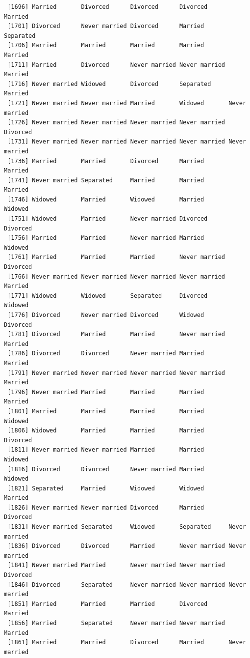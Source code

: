 \documentclass[
  letterpaper,
  DIV=11,
  numbers=noendperiod,
  oneside]{scrartcl}
\begin{document}
\begin{verbatim}
 [1696] Married       Divorced      Divorced      Divorced      Married      
 [1701] Divorced      Never married Divorced      Married       Separated    
 [1706] Married       Married       Married       Married       Married      
 [1711] Married       Divorced      Never married Never married Married      
 [1716] Never married Widowed       Divorced      Separated     Married      
 [1721] Never married Never married Married       Widowed       Never married
 [1726] Never married Never married Never married Never married Divorced     
 [1731] Never married Never married Never married Never married Never married
 [1736] Married       Married       Divorced      Married       Married      
 [1741] Never married Separated     Married       Married       Married      
 [1746] Widowed       Married       Widowed       Married       Widowed      
 [1751] Widowed       Married       Never married Divorced      Divorced     
 [1756] Married       Married       Never married Married       Widowed      
 [1761] Married       Married       Married       Never married Divorced     
 [1766] Never married Never married Never married Never married Married      
 [1771] Widowed       Widowed       Separated     Divorced      Widowed      
 [1776] Divorced      Never married Divorced      Widowed       Divorced     
 [1781] Divorced      Married       Married       Never married Married      
 [1786] Divorced      Divorced      Never married Married       Married      
 [1791] Never married Never married Never married Never married Married      
 [1796] Never married Married       Married       Married       Married      
 [1801] Married       Married       Married       Married       Widowed      
 [1806] Widowed       Married       Married       Married       Divorced     
 [1811] Never married Never married Married       Married       Widowed      
 [1816] Divorced      Divorced      Never married Married       Widowed      
 [1821] Separated     Married       Widowed       Widowed       Married      
 [1826] Never married Never married Divorced      Married       Divorced     
 [1831] Never married Separated     Widowed       Separated     Never married
 [1836] Divorced      Divorced      Married       Never married Never married
 [1841] Never married Married       Never married Never married Divorced     
 [1846] Divorced      Separated     Never married Never married Never married
 [1851] Married       Married       Married       Divorced      Married      
 [1856] Married       Separated     Never married Never married Married      
 [1861] Married       Married       Divorced      Married       Never married

\end{verbatim}
\end{document}
